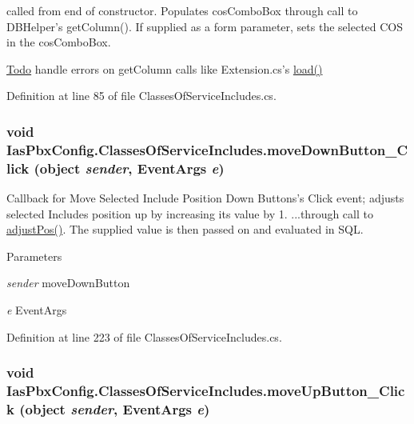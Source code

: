 called from end of constructor. Populates cosComboBox through call to DBHelper's getColumn(). If supplied as a form parameter, sets the selected COS in the cosComboBox. \begin{Desc}
\item[\hyperlink{todo__todo000007}{Todo}]handle errors on getColumn calls like Extension.cs's \hyperlink{class_ias_pbx_config_1_1_classes_of_service_includes_afba25c0ca7c6b26bcd5e8b6984758908}{load()} \end{Desc}


Definition at line 85 of file ClassesOfServiceIncludes.cs.\hypertarget{class_ias_pbx_config_1_1_classes_of_service_includes_abb1231755250bc18b9dcaf0e9437b5b1}{
\subsubsection[{moveDownButton\_\-Click}]{\setlength{\rightskip}{0pt plus 5cm}void IasPbxConfig.ClassesOfServiceIncludes.moveDownButton\_\-Click (object {\em sender}, \/  EventArgs {\em e})}}
\label{class_ias_pbx_config_1_1_classes_of_service_includes_abb1231755250bc18b9dcaf0e9437b5b1}


Callback for Move Selected Include Position Down Buttons's Click event; adjusts selected Includes position up by increasing its value by 1. ...through call to \hyperlink{class_ias_pbx_config_1_1_classes_of_service_includes_a1a77c41288db274dbe205da6b34ccb1f}{adjustPos()}. The supplied value is then passed on and evaluated in SQL. 
\begin{DoxyParams}{Parameters}
\item[{\em sender}]moveDownButton \item[{\em e}]EventArgs \end{DoxyParams}


Definition at line 223 of file ClassesOfServiceIncludes.cs.\hypertarget{class_ias_pbx_config_1_1_classes_of_service_includes_a17c623b9aeb6cc338cb883a48cd9150f}{
\subsubsection[{moveUpButton\_\-Click}]{\setlength{\rightskip}{0pt plus 5cm}void IasPbxConfig.ClassesOfServiceIncludes.moveUpButton\_\-Click (object {\em sender}, \/  EventArgs {\em e})}}
\label{class_ias_pbx_config_1_1_classes_of_service_includes_a17c623b9aeb6cc338cb883a48cd9150f}


